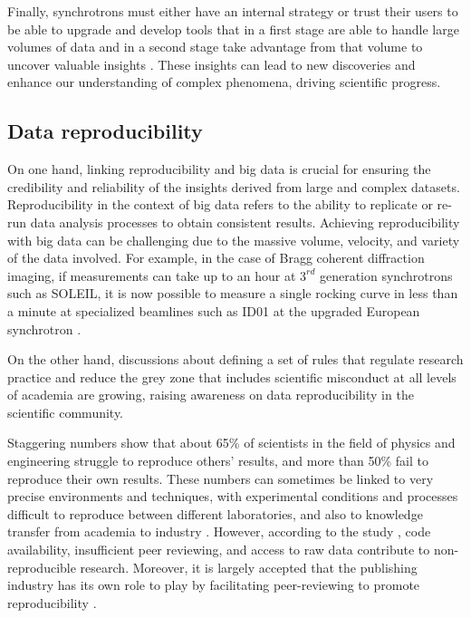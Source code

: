Finally, synchrotrons must either have an internal strategy or trust their users to be able to upgrade and develop tools that in a first stage are able to handle large volumes of data and in a second stage take advantage from that volume to uncover valuable insights \parencite{WangIEEE2016, Khaleghi2019}.
These insights can lead to new discoveries and enhance our understanding of complex phenomena, driving scientific progress.


\subsection{Data reproducibility}

On one hand, linking reproducibility and big data is crucial for ensuring the credibility and reliability of the insights derived from large and complex datasets.
Reproducibility in the context of big data refers to the ability to replicate or re-run data analysis processes to obtain consistent results.
Achieving reproducibility with big data can be challenging due to the massive volume, velocity, and variety of the data involved.
For example, in the case of Bragg coherent diffraction imaging, if measurements can take up to an hour at $3^{rd}$ generation synchrotrons such as SOLEIL, it is now possible to measure a single rocking curve in less than a minute at specialized beamlines such as ID01 at the upgraded European synchrotron \parencite{Richter2019}.

On the other hand, discussions about defining a set of rules that regulate research practice \parencite{Kretser2019} and reduce the grey zone that includes scientific misconduct at all levels of academia \parencite{Kornfeld2016} are growing, raising awareness on data reproducibility in the scientific community.

Staggering numbers \parencite{Baker2016} show that about 65\% of scientists in the field of physics and engineering struggle to reproduce others' results, and more than 50\% fail to reproduce their own results.
These numbers can sometimes be linked to very precise environments and techniques, with experimental conditions and processes difficult to reproduce between different laboratories, and also to knowledge transfer from academia to industry \parencite{DanielSarwitz2015}.
However, according to the study  \parencite{Baker2016}, code availability, insufficient peer reviewing, and access to raw data contribute to non-reproducible research.
Moreover, it is largely accepted that the publishing industry has its own role to play by facilitating peer-reviewing to promote reproducibility \parencite{Lee2017}.

